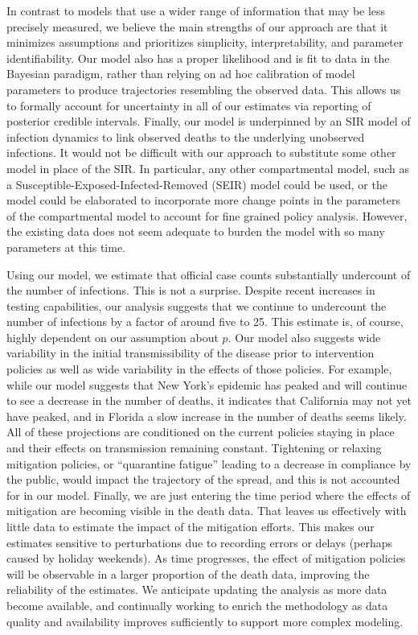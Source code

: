 \documentclass[11pt]{article}
\theoremstyle{plain}
\newcommand{\1}{\mathbf 1}
\begin{document}
In contrast to models that use a wider range of information that may be less precisely measured, we believe the main strengths of our approach are that it minimizes assumptions and prioritizes simplicity, interpretability, and parameter identifiability. Our model also has a proper likelihood and is fit to data in the Bayesian paradigm, rather than relying on ad hoc calibration of model parameters to produce trajectories resembling the observed data. This allows us to formally account for uncertainty in all of our estimates via reporting of posterior credible intervals. Finally, our model is underpinned by an SIR model of infection dynamics to link observed deaths to the underlying unobserved infections. It would not be difficult with our approach to substitute some other model in place of the SIR. In particular, any other compartmental model, such as a Susceptible-Exposed-Infected-Removed (SEIR) model could be used, or the model could be elaborated to incorporate more change points in the parameters of the compartmental model to account for fine grained policy analysis. However, the existing data does not seem adequate to burden the model with so many parameters at this time.

Using our model, we estimate that official case counts substantially undercount of the number of infections.  This is not a surprise. Despite recent increases in testing capabilities, our analysis suggests that we continue to undercount the number of infections by a factor of around five to 25. This estimate is, of course, highly dependent on our assumption about $p$. Our model also suggests wide variability in the initial transmissibility of the disease prior to intervention policies as well as wide variability in the effects of those policies. For example, while our model suggests that New York's epidemic has peaked and will continue to see a decrease in the number of deaths, it indicates that California may not yet have peaked, and in Florida a slow increase in the number of deaths seems likely. All of these projections are conditioned on the current policies staying in place and their effects on transmission remaining constant. Tightening or relaxing mitigation policies, or ``quarantine fatigue'' leading to a decrease in compliance by the public, would impact the trajectory of the spread, and this is not accounted for in our model. Finally, we are just entering the time period where the effects of mitigation are becoming visible in the death data. That leaves us effectively with little data to estimate the impact of the mitigation efforts. This makes our estimates sensitive to perturbations due to recording errors or delays (perhaps caused by holiday weekends). As time progresses, the effect of mitigation policies will be observable in a larger proportion of the death data, improving the reliability of the estimates. We anticipate updating the analysis as more data become available, and continually working to enrich the methodology as data quality and availability improves sufficiently to support more complex modeling.
\end{document}
